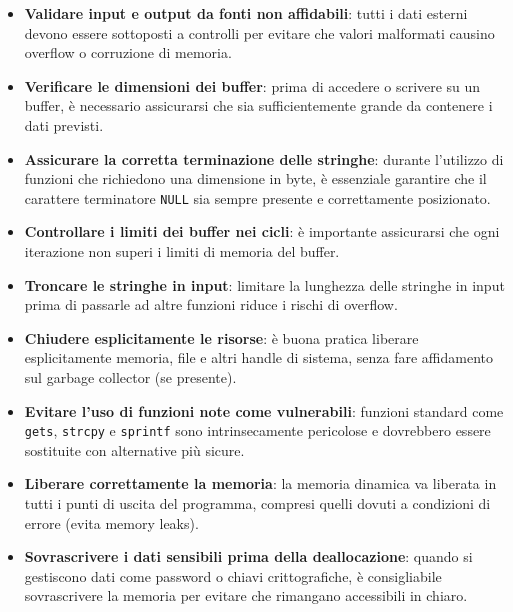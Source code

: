 \begin{itemize}
  \item \textbf{Validare input e output da fonti non affidabili}: tutti i dati esterni
    devono essere sottoposti a controlli per evitare che valori malformati causino
    overflow o corruzione di memoria.

  \item \textbf{Verificare le dimensioni dei buffer}: prima di accedere o scrivere
    su un buffer, è necessario assicurarsi che sia sufficientemente grande da
    contenere i dati previsti.

  \item \textbf{Assicurare la corretta terminazione delle stringhe}: durante l'utilizzo
    di funzioni che richiedono una dimensione in byte, è essenziale garantire
    che il carattere terminatore \texttt{NULL} sia sempre presente e correttamente
    posizionato.

  \item \textbf{Controllare i limiti dei buffer nei cicli}: è importante assicurarsi
    che ogni iterazione non superi i limiti di memoria del buffer.

  \item \textbf{Troncare le stringhe in input}: limitare la lunghezza delle stringhe
    in input prima di passarle ad altre funzioni riduce i rischi di overflow.

  \item \textbf{Chiudere esplicitamente le risorse}: è buona pratica liberare esplicitamente
    memoria, file e altri handle di sistema, senza fare affidamento sul garbage collector
    (se presente).

  \item \textbf{Evitare l'uso di funzioni note come vulnerabili}: funzioni standard
    come \texttt{gets}, \texttt{strcpy} e \texttt{sprintf} sono intrinsecamente pericolose
    e dovrebbero essere sostituite con alternative più sicure.

  \item \textbf{Liberare correttamente la memoria}: la memoria dinamica va liberata
    in tutti i punti di uscita del programma, compresi quelli dovuti a
    condizioni di errore (evita memory leaks).

  \item \textbf{Sovrascrivere i dati sensibili prima della deallocazione}: quando
    si gestiscono dati come password o chiavi crittografiche, è consigliabile
    sovrascrivere la memoria per evitare che rimangano accessibili in chiaro.
\end{itemize}

